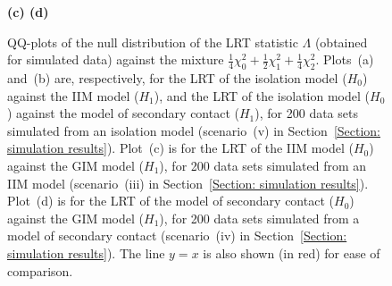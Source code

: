 \documentclass[11pt]{article}
\begin{document}
{\begin{figure}[t]
\vspace*{-0.5cm}
\par\smallskip
\textbf{\hspace*{-1cm} (c) \hspace*{8cm} (d)}\par\smallskip
\vspace*{-0.5cm}
\vspace*{-0.5cm}
\caption{QQ-plots of the null distribution of the LRT statistic $\Lambda$ (obtained for simulated data) against the mixture $\frac{1}{4} \chi^2_0 +\frac{1}{2} \chi^2_1 +\frac{1}{4} \chi^2_2$. Plots~(a) and~(b) are, respectively, for the LRT of the isolation model ($H_0$) against the IIM model ($H_1$), and the LRT of the isolation model ($H_0$) against the model of secondary contact ($H_1$), for 200 data sets simulated from an isolation model (scenario~(v) in Section~\ref{Section: simulation results}).
Plot~(c) is for the LRT of the IIM model ($H_0$) against the GIM model ($H_1$), for 200 data sets simulated from an IIM model (scenario~(iii) in Section~\ref{Section: simulation results}). Plot~(d) is for the LRT of the model of secondary contact ($H_0$) against the GIM model ($H_1$), for 200 data sets simulated from a model of secondary contact (scenario~(iv) in Section~\ref{Section: simulation results}).
The line $y=x$ is also shown (in red) for ease of comparison.
 }
\label{QQplots}
\end{figure}

}
\end{document}

